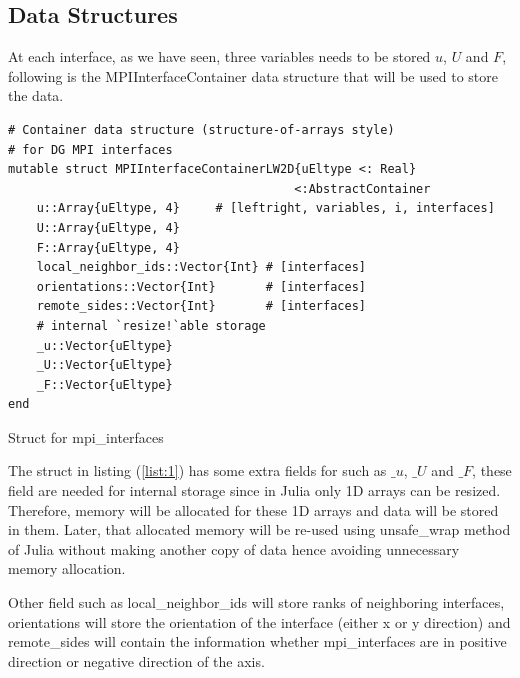 \subsection{Data Structures}
At each interface, as we have seen, three variables needs to be stored $u$, $U$ and $F$, following is the {\ttfamily MPIInterfaceContainer} data structure that will be used to store the data.
\begin{listing}[!ht]
\centering
    \begin{verbatim}
# Container data structure (structure-of-arrays style) 
# for DG MPI interfaces
mutable struct MPIInterfaceContainerLW2D{uEltype <: Real}
                                        <:AbstractContainer
    u::Array{uEltype, 4}     # [leftright, variables, i, interfaces]
    U::Array{uEltype, 4}
    F::Array{uEltype, 4}
    local_neighbor_ids::Vector{Int} # [interfaces]
    orientations::Vector{Int}       # [interfaces]
    remote_sides::Vector{Int}       # [interfaces]
    # internal `resize!`able storage
    _u::Vector{uEltype}
    _U::Vector{uEltype}
    _F::Vector{uEltype}
end
    \end{verbatim}
    \caption{Struct for mpi\_interfaces}
    \label{list:1}
\end{listing}

The {\ttfamily struct} in listing (\ref{list:1}) has some extra fields for such as $\_u$, $\_U$ and $\_F$, these field are needed for internal storage since in {\ttfamily Julia} only 1D arrays can be resized.
Therefore, memory will be allocated for these 1D arrays and data will be stored in them. Later, that allocated memory will be re-used using {\ttfamily unsafe\_wrap} method of {\ttfamily Julia}
without making another copy of data hence avoiding unnecessary memory allocation.

Other field such as {\ttfamily local\_neighbor\_ids} will store {\ttfamily ranks} of neighboring interfaces, {\ttfamily orientations} will store the orientation of the interface (either x or y direction)
and {\ttfamily remote\_sides} will contain the information whether {\ttfamily mpi\_interfaces} are in positive direction or negative direction of the axis.

